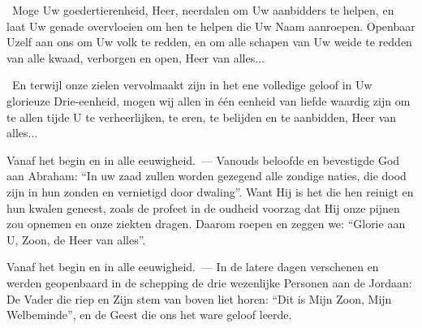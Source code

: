 \documentclass[12pt,twoside,a5paper]{article}
\begin{document}
\begin{halfparskip}
   \cc~Moge Uw goedertierenheid, Heer, neerdalen om Uw aanbidders te helpen, en laat Uw  genade overvloeien om hen te helpen die Uw Naam aanroepen. Openbaar Uzelf aan ons om Uw volk te redden, en om alle schapen van Uw weide te redden van alle kwaad, verborgen en open, Heer van alles...

   \cc~En terwijl onze zielen vervolmaakt zijn in het ene volledige geloof in Uw glorieuze Drie-eenheid, mogen wij allen in één eenheid van liefde waardig zijn om te allen tijde U te verheerlijken, te eren, te belijden en te aanbidden, Heer van alles...
\end{halfparskip}



\begin{halfparskip}
   Vanaf het begin en in alle eeuwigheid.~--- Vanouds beloofde en bevestigde God aan Abraham: ``In uw zaad zullen worden gezegend alle zondige naties, die dood zijn in hun zonden en vernietigd door dwaling''. Want Hij is het die hen reinigt en hun kwalen geneest, zoals de profeet in de oudheid voorzag dat Hij onze pijnen zou opnemen en onze ziekten dragen. Daarom roepen en zeggen we: ``Glorie aan U, Zoon, de Heer van alles''.
\end{halfparskip}

\begin{halfparskip}
\end{halfparskip}

\begin{halfparskip}
   Vanaf het begin en in alle eeuwigheid.~--- In de latere dagen verschenen en werden geopenbaard in de schepping de drie wezenlijke Personen aan de Jordaan: De Vader die riep en Zijn stem van boven liet horen: ``Dit is Mijn Zoon, Mijn Welbeminde'', en de Geest die ons het ware geloof leerde.
\end{halfparskip}

\begin{halfparskip}
   
\end{halfparskip}
\end{document}
